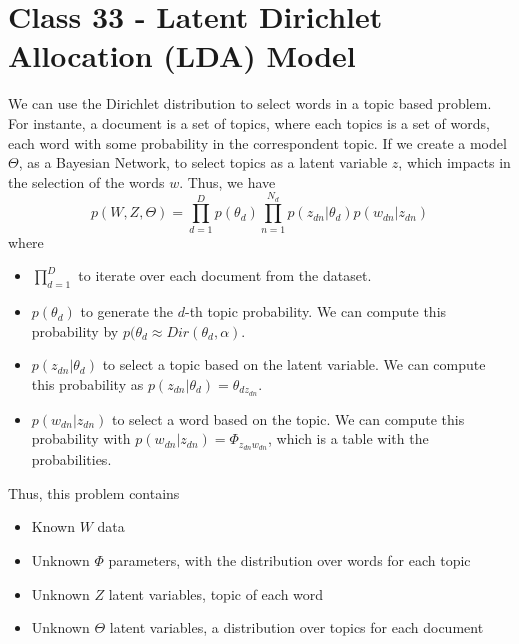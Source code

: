 \documentclass{article}
\begin{document}
\section{Class 33 - Latent Dirichlet Allocation (LDA) Model}
We can use the Dirichlet distribution to select words in a topic based problem. For instante, a document is a set of topics, where each topics is a set of words, each word with some probability in the correspondent topic. If we create a model $\Theta$, as a Bayesian Network, to select topics as a latent variable $z$, which impacts in the selection of the words $w$. Thus, we have
\begin{equation}
    p(W, Z, \Theta) = \prod_{d=1}^D p(\theta_d) \prod_{n=1}^{N_d} p(z_{dn}|\theta_d) p(w_{dn}|z_{dn})
\end{equation}
where \begin{itemize}
    \item $\prod_{d=1}^D$ to iterate over each document from the dataset.
    \item $p(\theta_d)$ to generate the $d$-th topic probability. We can compute this probability by $p(\theta_d \approx Dir(\theta_d, \alpha)$.
    \item $p(z_{dn}|\theta_d)$ to select a topic based on the latent variable. We can compute this probability as $p(z_{dn}|\theta_d) = \theta_{dz_{dn}}$.
    \item $p(w_{dn}|z_{dn})$ to select a word based on the topic. We can compute this probability with $p(w_{dn}|z_{dn}) = \Phi_{z_{dn}w_{dn}}$, which is a table with the probabilities.
\end{itemize}
Thus, this problem contains
\begin{itemize}
    \item Known $W$ data
    \item Unknown $\Phi$ parameters, with the distribution over words for each topic
    \item Unknown $Z$ latent variables, topic of each word
    \item Unknown $\Theta$ latent variables, a distribution over topics for each document
\end{itemize}
\end{document}
